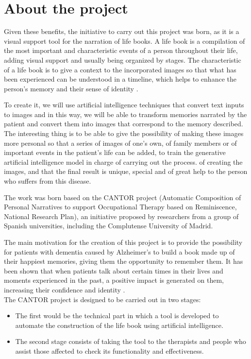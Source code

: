 	\section{About the project}
	
	Given these benefits, the initiative to carry out this project was born, as it is a visual support tool for the narration of life books. A life book is a compilation of the most important and characteristic events of a person throughout their life, adding visual support and usually being organized by stages. The characteristic of a life book is to give a context to the incorporated images so that what has been experienced can be understood in a timeline, which helps to enhance the person's memory and their sense of identity \citep{life book }. 
	
	To create it, we will use artificial intelligence techniques that convert text inputs to images and in this way, we will be able to transform memories narrated by the patient and convert them into images that correspond to the memory described. The interesting thing is to be able to give the possibility of making these images more personal so that a series of images of one's own, of family members or of important events in the patient's life can be added, to train the generative artificial intelligence model in charge of carrying out the process. of creating the images, and that the final result is unique, special and of great help to the person who suffers from this disease. 
	
	The work was born based on the CANTOR project (Automatic Composition of Personal Narratives to support Occupational Therapy based on Reminiscence, National Research Plan), an initiative proposed by researchers from a group of Spanish universities, including the Complutense University of Madrid.
	
	The main motivation for the creation of this project is to provide the possibility for patients with dementia caused by Alzheimer's to build a book made up of their happiest memories, giving them the opportunity to remember them. It has been shown that when patients talk about certain times in their lives and moments experienced in the past, a positive impact is generated on them, increasing their confidence and identity \citep{UCMcantor}.\\
	
The CANTOR project is designed to be carried out in two stages: 
\begin{itemize}
	\item The first would be the technical part in which a tool is developed to automate the construction of the life book using artificial intelligence. 
	\item The second stage consists of taking the tool to the therapists and people who assist those affected to check its functionality and effectiveness. 
\end{itemize}

